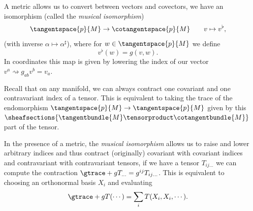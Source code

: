 \documentclass[titlepage,numbers=noenddot,oneside,%
cleardoublepage=empty,paper=a4,fontsize=11pt,%
english,%
]{scrartcl}
\begin{document}
\begin{remark}
    A metric allows us to convert between vectors and covectors, \ie we have an isomorphism (called the \emph{musical isomorphism})
    \begin{equation*}
        \tangentspace{p}{M}\to \cotangentspace{p}{M}\qquad v\mapsto v^\flat,
    \end{equation*}
    (with inverse \( \alpha\mapsto \alpha^{\sharp} \)), where for \( w\in \tangentspace{p}{M} \) we define
    \begin{equation*}
        v^{\flat}(w)=g(v,w).
    \end{equation*}
    In coordinates this map is given by lowering the index of our vector \ie \( v^a\rightsquigarrow g_{ab}v^b=v_a \).
\end{remark}
\begin{remark}
    Recall that on any manifold, we can always contract one covariant and one contravariant index of a tensor. This is equivalent to taking the trace of the endomorphism \( \tangentspace{p}{M}\to \tangentspace{p}{M} \) given by this \( \sheafsections{\tangentbundle{M}\tensorproduct \cotangentbundle{M}} \) part of the tensor.
    
    In the presence of a metric, the \emph{musical isomorphism} allows us to raise and lower arbitrary indices and thus contract (originally) covariant with covariant indices and contravariant with contravariant tensors, \ie if we have a tensor \( T_{ij\dotsc} \) we can compute the contraction \( \gtrace+{g}{T}_{\dotsc}=g^{ij}T_{ij\dotsc} \). This is equivalent to choosing an orthonormal basis \( X_i \) and evaluating
    \begin{equation*}
        \gtrace+{g}{T}(\cdots)=\sum_{i}T(X_i,X_i,\cdots).
    \end{equation*}
\end{remark}
\end{document}
